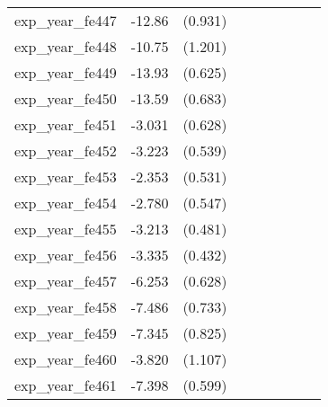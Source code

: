 {\begin{tabular}{l*{4}{cc}}
exp\_year\_fe447&   -12.86\sym{***}&  (0.931)&                  &         &                  &         &                  &         \\
exp\_year\_fe448&   -10.75\sym{***}&  (1.201)&                  &         &                  &         &                  &         \\
exp\_year\_fe449&   -13.93\sym{***}&  (0.625)&                  &         &                  &         &                  &         \\
exp\_year\_fe450&   -13.59\sym{***}&  (0.683)&                  &         &                  &         &                  &         \\
exp\_year\_fe451&   -3.031\sym{***}&  (0.628)&                  &         &                  &         &                  &         \\
exp\_year\_fe452&   -3.223\sym{***}&  (0.539)&                  &         &                  &         &                  &         \\
exp\_year\_fe453&   -2.353\sym{***}&  (0.531)&                  &         &                  &         &                  &         \\
exp\_year\_fe454&   -2.780\sym{***}&  (0.547)&                  &         &                  &         &                  &         \\
exp\_year\_fe455&   -3.213\sym{***}&  (0.481)&                  &         &                  &         &                  &         \\
exp\_year\_fe456&   -3.335\sym{***}&  (0.432)&                  &         &                  &         &                  &         \\
exp\_year\_fe457&   -6.253\sym{***}&  (0.628)&                  &         &                  &         &                  &         \\
exp\_year\_fe458&   -7.486\sym{***}&  (0.733)&                  &         &                  &         &                  &         \\
exp\_year\_fe459&   -7.345\sym{***}&  (0.825)&                  &         &                  &         &                  &         \\
exp\_year\_fe460&   -3.820\sym{***}&  (1.107)&                  &         &                  &         &                  &         \\
exp\_year\_fe461&   -7.398\sym{***}&  (0.599)&                  &         &                  &         &                  &         \\

\end{tabular}}

